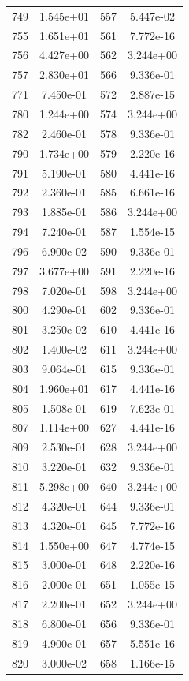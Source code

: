 \documentclass[12pt]{article}
\begin{document}
\begin{longtable}{@{}cccc@{}}
749 & 1.545e+01 & 557 & 5.447e-02 \\
755 & 1.651e+01 & 561 & 7.772e-16 \\
756 & 4.427e+00 & 562 & 3.244e+00 \\
757 & 2.830e+01 & 566 & 9.336e-01 \\
771 & 7.450e-01 & 572 & 2.887e-15 \\
780 & 1.244e+00 & 574 & 3.244e+00 \\
782 & 2.460e-01 & 578 & 9.336e-01 \\
790 & 1.734e+00 & 579 & 2.220e-16 \\
791 & 5.190e-01 & 580 & 4.441e-16 \\
792 & 2.360e-01 & 585 & 6.661e-16 \\
793 & 1.885e-01 & 586 & 3.244e+00 \\
794 & 7.240e-01 & 587 & 1.554e-15 \\
796 & 6.900e-02 & 590 & 9.336e-01 \\
797 & 3.677e+00 & 591 & 2.220e-16 \\
798 & 7.020e-01 & 598 & 3.244e+00 \\
800 & 4.290e-01 & 602 & 9.336e-01 \\
801 & 3.250e-02 & 610 & 4.441e-16 \\
802 & 1.400e-02 & 611 & 3.244e+00 \\
803 & 9.064e-01 & 615 & 9.336e-01 \\
804 & 1.960e+01 & 617 & 4.441e-16 \\
805 & 1.508e-01 & 619 & 7.623e-01 \\
807 & 1.114e+00 & 627 & 4.441e-16 \\
809 & 2.530e-01 & 628 & 3.244e+00 \\
810 & 3.220e-01 & 632 & 9.336e-01 \\
811 & 5.298e+00 & 640 & 3.244e+00 \\
812 & 4.320e-01 & 644 & 9.336e-01 \\
813 & 4.320e-01 & 645 & 7.772e-16 \\
814 & 1.550e+00 & 647 & 4.774e-15 \\
815 & 3.000e-01 & 648 & 2.220e-16 \\
816 & 2.000e-01 & 651 & 1.055e-15 \\
817 & 2.200e-01 & 652 & 3.244e+00 \\
818 & 6.800e-01 & 656 & 9.336e-01 \\
819 & 4.900e-01 & 657 & 5.551e-16 \\
820 & 3.000e-02 & 658 & 1.166e-15 \\

\end{longtable}
\end{document}
